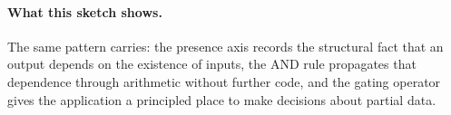 \paragraph{What this sketch shows.} The same pattern carries: the
presence axis records the structural fact that an output depends on the
existence of inputs, the AND rule propagates that dependence through
arithmetic without further code, and the gating operator gives the
application a principled place to make decisions about partial data.
